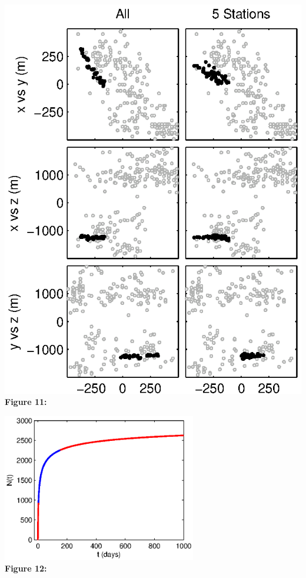 \documentclass[12pt,double]{article}
\begin{document}

\clearpage
\includegraphics{Figure11_bw.eps} \\
\textbf{Figure 11:} 


\clearpage
\noindent\includegraphics[width = 20pc]{Figure12_c.eps} \\
\textbf{Figure 12:} 
\end{document}
